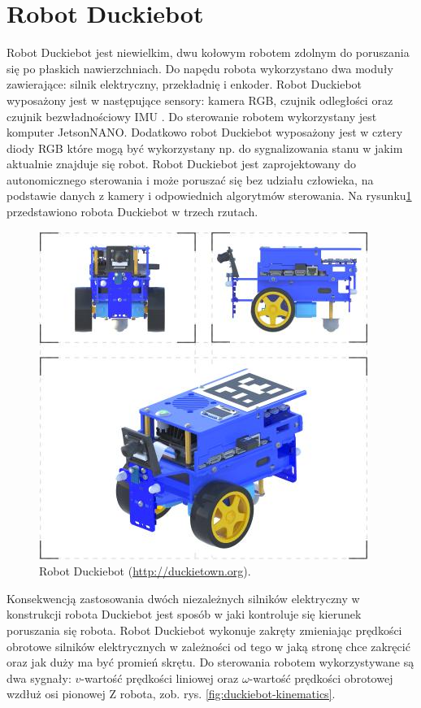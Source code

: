 \documentclass[conference]{IEEEtran}
\begin{document}
\section{Robot Duckiebot}\label{sec:robot-duckiebot}
Robot Duckiebot jest niewielkim, dwu kołowym robotem zdolnym do poruszania się po płaskich nawierzchniach. Do napędu robota wykorzystano dwa moduły zawierające: silnik elektryczny, przekładnię i enkoder. Robot Duckiebot wyposażony jest w następujące sensory: kamera RGB, czujnik odległości oraz czujnik bezwładnościowy IMU \cite{gupta2022low}. Do sterowanie robotem wykorzystany jest komputer JetsonNANO. Dodatkowo robot Duckiebot wyposażony jest w cztery diody RGB które mogą być wykorzystany np. do sygnalizowania stanu w jakim aktualnie znajduje się robot. Robot Duckiebot jest zaprojektowany do autonomicznego sterowania i może poruszać się bez udziału człowieka, na podstawie danych z kamery i odpowiednich algorytmów sterowania. Na rysunku\;\ref{fig:duckiebot-3d} przedstawiono robota Duckiebot w trzech rzutach.

\begin{figure}[h]
    \centering
    \includegraphics[width=.9\columnwidth]{duckiebot-blue-3d}
    \caption{Robot Duckiebot (\url{http://duckietown.org}).}
    \label{fig:duckiebot-3d}
\end{figure}

Konsekwencją zastosowania dwóch niezależnych silników elektryczny w konstrukcji robota Duckiebot jest sposób w jaki kontroluje się kierunek poruszania się robota.
Robot Duckiebot wykonuje zakręty zmieniając prędkości obrotowe silników elektrycznych w zależności od tego w jaką stronę chce zakręcić oraz jak duży ma być promień skrętu.
Do sterowania robotem wykorzystywane są dwa sygnały: $v$-wartość prędkości liniowej oraz $\omega$-wartość prędkości obrotowej wzdłuż osi pionowej Z robota, zob. rys. \ref{fig:duckiebot-kinematics}.
\end{document}
